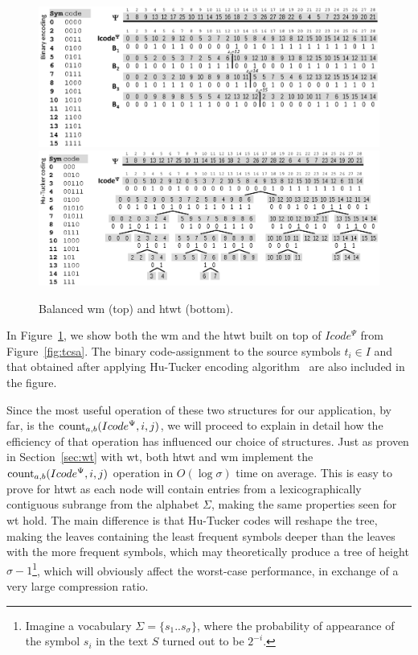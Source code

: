 	\begin{figure}[ht]
		\begin{center}
			{\includegraphics[width=1.0\textwidth]{figures/wma.eps}}
			{\includegraphics[width=1.0\textwidth]{figures/wta.eps}}
		\end{center}
		\caption{Balanced \acrshort{wm} (top) and \acrshort{htwt} (bottom).}
		\label{fig:wtwm}
	\end{figure}


	In Figure~\ref{fig:wtwm}, we show both the \gls{wm} and the \gls{htwt} built on top of $Icode^{\Psi}$ from Figure~\ref{fig:tcsa}.
	The binary code-assignment to the source symbols $t_i \in I$ and that obtained after applying Hu-Tucker encoding
	algorithm~\cite{hu1971optimal} are also included in the figure.
	
	Since the most useful operation of these two structures for our application, by far, is the $\operatorname{count}_{a,b}(Icode^{\Psi},i,j)$, we will proceed to explain in detail how the efficiency of that operation has influenced our choice of structures. Just as proven in Section~\ref{sec:wt} with \gls{wt}, both \gls{htwt} and \gls{wm} implement the $\operatorname{count}_{a,b}(Icode^{\Psi},i,j)$ operation in $O(\log\sigma)$ time on average. This is easy to prove for \gls{htwt} as each node will contain entries from a lexicographically contiguous subrange from the alphabet $\Sigma$, making the same properties seen for \gls{wt} hold. The main difference is that Hu-Tucker codes will reshape the tree, making the leaves containing the least frequent symbols deeper than the leaves with the more frequent symbols, which may theoretically produce a tree of height $\sigma-1$\footnote{Imagine a vocabulary $\Sigma=\{s_1..s_\sigma\}$, where the probability of appearance of the symbol $s_i$ in the text $S$ turned out to be $2^{-i}$.}, which will obviously affect the worst-case performance, in exchange of a very large compression ratio.

